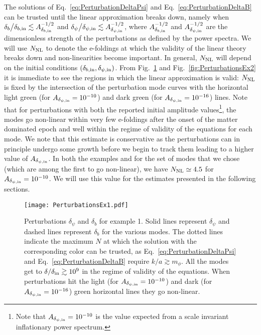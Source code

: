 \documentclass[a4paper, amsfonts, amssymb, amsmath, reprint, showkeys, nofootinbib, twoside, superscriptaddress]{revtex4-1}
\begin{document}
The  solutions of Eq.~\eqref{eq:PerturbationDeltaPsi} and Eq.~\eqref{eq:PerturbationDeltaB} can be trusted until the linear approximation breaks down, namely when $\delta_{b} \big{/} \delta_{b, \rm in} \lesssim A^{-1/2}_{\delta_{b, \rm in}}$ and 
$\delta_\psi \big{/} \delta_{\psi, \rm in}  \lesssim  A^{-1/2}_{\delta_{\psi, \rm in}}$, where $A^{-1/2}_{\delta_{b, \rm in}}$ and  $A^{-1/2}_{\delta_{\psi, \rm in}}$  are the dimensionless strength of the perturbations as defined by the power spectra. We will use  $N_{\rm NL}$ to denote the e-foldings at which the validity of the linear theory breaks down and non-linearities become important. In general, $N_{\rm NL}$ will depend on the initial conditions $(\delta_{b, \rm{in}}, \delta_{\psi, \rm{in}})$. From Fig.~\ref{fig:PerturbationsEx1} and Fig.~\ref{fig:PerturbationsEx2} it is immediate to see the regions in which the linear approximation is valid: $N_{\rm NL}$ is fixed by the intersection of the perturbation mode curves with the horizontal light green (for $A_{\delta_{\psi, \rm in}} = 10^{-10}$) and dark green (for $A_{\delta_{\psi, \rm in}} = 10^{-16}$) lines. Note that for perturbations with both the reported initial amplitude values\footnote{Note that $A_{\delta_{\psi, \rm in}}=10^{-10}$ is the value expected from a scale invariant inflationary power spectrum.}, the modes go non-linear within very few e-foldings after the onset of the matter dominated epoch and well within the regime of validity of the equations for each mode. We note that this estimate is conservative as the perturbations can in principle undergo some growth before we begin to track them leading to a higher value
of $A_{\delta_{\psi, \rm in}}$. In both the examples and for the set of modes that we chose (which are among the first to go non-linear), we have $N_{\rm NL} \simeq 4.5$ for $A_{\delta_{\psi, \rm in}} = 10^{-10}$. We will use this value for the estimates presented in the following sections.
%
\begin{figure}[h!]
  \texttt{[image: PerturbationsEx1.pdf]}
\caption{Perturbations $\delta_\psi$ and $\delta_b$ for example 1. Solid lines represent $\delta_\psi$ and dashed lines represent $\delta_b$ for the various modes. The dotted lines indicate the maximum $N$ at which the solution with the corresponding color can be trusted, as Eq.~\eqref{eq:PerturbationDeltaPsi} and Eq.~\eqref{eq:PerturbationDeltaB} require $k/a \gtrsim m_\phi$. All the modes get to $\delta/\delta_{\rm in} \gtrsim 10^9$ in the regime of validity of the equations. When perturbations hit the light (for $A_{\delta_{\psi, \rm in}} = 10^{-10}$) and dark (for $A_{\delta_{\psi, \rm in}} = 10^{-16}$) green horizontal lines they go non-linear.}
\label{fig:PerturbationsEx1}
\end{figure}
\end{document}
